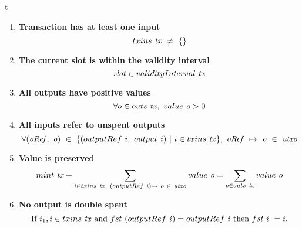 \begin{ruledfigure}{t}
\begin{enumerate}
  \item
    \label{rule:has-input}
    \textbf{Transaction has at least one input}
    \begin{displaymath}
      \inputs~\var{tx}~\neq~\{\}
    \end{displaymath}

  \item
    \label{rule:slot-in-range}
    \textbf{The current slot is within the validity interval}
    \begin{displaymath}
      \var{slot} \in \fun{validityInterval}~\var{tx}
    \end{displaymath}

  \item
    \label{rule:all-outputs-are-positive}
    \textbf{All outputs have positive values}
    \begin{displaymath}
      \forall o \in \outputs~\var{tx},\ \val~\var{o} > 0
    \end{displaymath}

  \item
    \label{rule:all-inputs-refer-to-unspent-outputs}
    \textbf{All inputs refer to unspent outputs}
    \begin{displaymath}
      \forall (\var{oRef},~\var{o})~\in~\{(\outputref~\var{i},~\fun{output}~\var{i}) ~|~ i \in \inputs~\var{tx} \},
      ~\var{oRef}~ \mapsto~\var{o}~ \in ~\var{utxo}
    \end{displaymath}

  \item
    \label{rule:value-is-preserved}
    \textbf{Value is preserved}
    \begin{displaymath}
      \mint~\var{tx} + \sum_{i \in \inputs~\var{tx},~(\outputref~i)\mapsto~o~\in~\var{utxo}} \val~\var{o} = \sum_{o \in \outputs~\var{tx}} \val~\var{o}
    \end{displaymath}

  \item
    \label{rule:no-double-spending}
    \textbf{No output is double spent}
    \begin{displaymath}
      \textrm{If } i_1, i \in \inputs~\var{tx} \textrm{ and } \fun{fst}~ (\outputref~\var{i}) = \outputref~\var{i}
      \textrm{ then } \fun{fst}~i~ = i.
    \end{displaymath}


\end{enumerate}
\end{ruledfigure}
